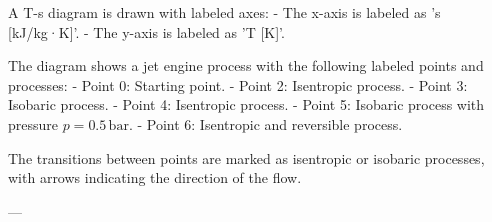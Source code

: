 A T-s diagram is drawn with labeled axes:  
- The x-axis is labeled as 's [kJ/kg·K]'.  
- The y-axis is labeled as 'T [K]'.  

The diagram shows a jet engine process with the following labeled points and processes:  
- Point 0: Starting point.  
- Point 2: Isentropic process.  
- Point 3: Isobaric process.  
- Point 4: Isentropic process.  
- Point 5: Isobaric process with pressure \( p = 0.5 \, \text{bar} \).  
- Point 6: Isentropic and reversible process.  

The transitions between points are marked as isentropic or isobaric processes, with arrows indicating the direction of the flow.  

---